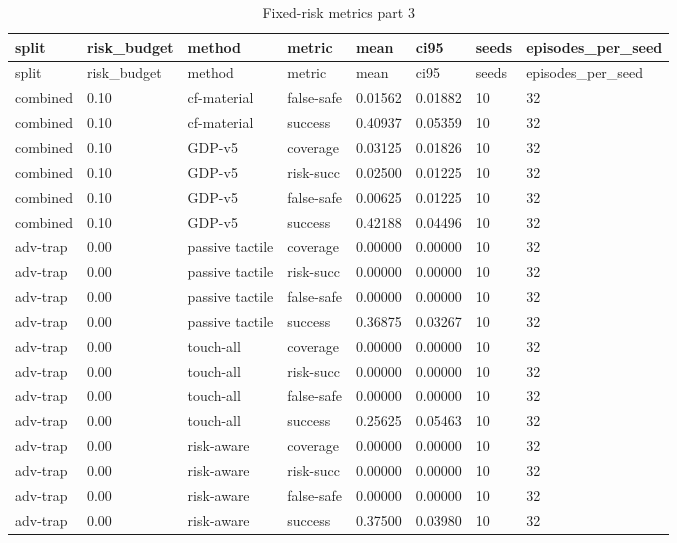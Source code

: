 \documentclass{article}
\begin{document}
\begin{center}
\tiny
\renewcommand{\arraystretch}{0.92}
\setlength{\tabcolsep}{3pt}
\begin{longtable}{llllllll}
\caption{Fixed-risk metrics part 3}\label{tab:fixed-risk-metrics-3}\\
\toprule
split & risk\_budget & method & metric & mean & ci95 & seeds & episodes\_per\_seed \\
\midrule
\endfirsthead
\toprule
split & risk\_budget & method & metric & mean & ci95 & seeds & episodes\_per\_seed \\
\midrule
\endhead
combined & 0.10 & cf-material & false-safe & 0.01562 & 0.01882 & 10 & 32 \\
combined & 0.10 & cf-material & success & 0.40937 & 0.05359 & 10 & 32 \\
combined & 0.10 & GDP-v5 & coverage & 0.03125 & 0.01826 & 10 & 32 \\
combined & 0.10 & GDP-v5 & risk-succ & 0.02500 & 0.01225 & 10 & 32 \\
combined & 0.10 & GDP-v5 & false-safe & 0.00625 & 0.01225 & 10 & 32 \\
combined & 0.10 & GDP-v5 & success & 0.42188 & 0.04496 & 10 & 32 \\
adv-trap & 0.00 & passive tactile & coverage & 0.00000 & 0.00000 & 10 & 32 \\
adv-trap & 0.00 & passive tactile & risk-succ & 0.00000 & 0.00000 & 10 & 32 \\
adv-trap & 0.00 & passive tactile & false-safe & 0.00000 & 0.00000 & 10 & 32 \\
adv-trap & 0.00 & passive tactile & success & 0.36875 & 0.03267 & 10 & 32 \\
adv-trap & 0.00 & touch-all & coverage & 0.00000 & 0.00000 & 10 & 32 \\
adv-trap & 0.00 & touch-all & risk-succ & 0.00000 & 0.00000 & 10 & 32 \\
adv-trap & 0.00 & touch-all & false-safe & 0.00000 & 0.00000 & 10 & 32 \\
adv-trap & 0.00 & touch-all & success & 0.25625 & 0.05463 & 10 & 32 \\
adv-trap & 0.00 & risk-aware & coverage & 0.00000 & 0.00000 & 10 & 32 \\
adv-trap & 0.00 & risk-aware & risk-succ & 0.00000 & 0.00000 & 10 & 32 \\
adv-trap & 0.00 & risk-aware & false-safe & 0.00000 & 0.00000 & 10 & 32 \\
adv-trap & 0.00 & risk-aware & success & 0.37500 & 0.03980 & 10 & 32 \\

\end{longtable}
\end{center}
\end{document}
